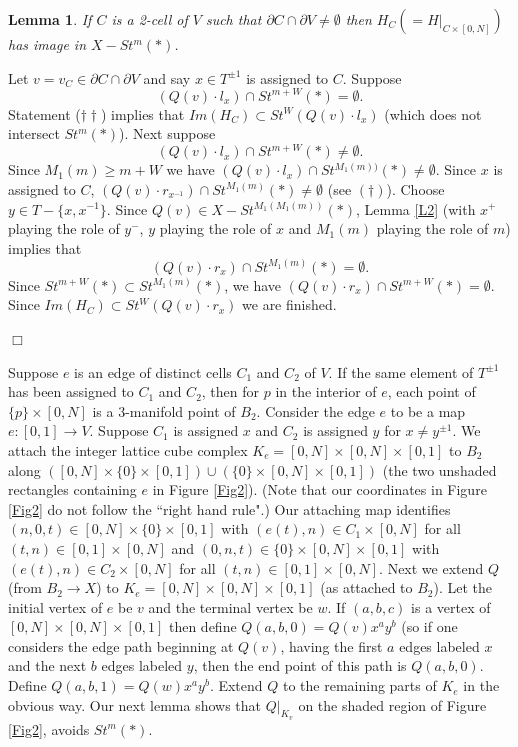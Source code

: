 \documentclass[12pt]{article}
\newtheorem{lemma}[theorem]{Lemma}
\newenvironment{proof}{\addvspace{12pt}\noindent{\bf Proof:}}{
$\Box$\par\addvspace{12pt}}
\numberwithin{equation}{section}
\begin{document}
\begin{lemma}\label{L6}
If $C$ is a 2-cell of $V$ such that  $\partial C\cap \partial V\ne \emptyset$ then $H_C(=H|_{C\times [0,N]})$ has image in $X-St^m(\ast)$. 
\end{lemma}
\begin{proof}
Let $v=v_C\in \partial C\cap \partial V$ and say $x\in T^{\pm1}$ is assigned to $C$.
Suppose 
$$(Q(v)\cdot l_{x})\cap St^{m+W}(\ast)= \emptyset.$$
Statement ($\dagger\dagger$) implies that  $Im(H_C)\subset St^{W}(Q(v)\cdot l_{x})$ (which does not intersect $St^m(\ast)$).
Next suppose 
$$(Q(v)\cdot l_{x})\cap St^{m+W}(\ast)\ne \emptyset .$$ 
Since $M_1(m)\geq m+W$ we have $(Q(v)\cdot l_{x})\cap St^{M_1(m))}(\ast)\ne \emptyset$.
Since $x$ is assigned to $C$, 
 $(Q(v)\cdot r_{x^{-1}})\cap St^{M_1(m)}(\ast)\ne \emptyset$ (see $(\dagger)$). Choose $y\in T-\{x, x^{-1}\}$.
Since $Q(v)\in X-St^{M_1(M_1(m))}(\ast)$, Lemma \ref{L2} (with $x^+$ playing the role of $y^-$, $y$ playing the role of $x$ and $M_1(m)$ playing the role of $m$) implies that 
$$(Q(v)\cdot r_x)\cap St^{M_1(m)}(\ast)=\emptyset.$$ 
Since $St^{m+W}(\ast) \subset St^{M_1(m)}(\ast)$, we have $(Q(v)\cdot r_{x})\cap St^{m+W}(\ast)=\emptyset$. Since $Im(H_C)\subset St^{W}(Q(v)\cdot r_{x})$ we are finished.
\end{proof}

Suppose $e$ is an edge of distinct cells $C_1$ and $C_2$ of $V$. If the same element of $T^{\pm 1}$ has been assigned to $C_1$ and $C_2$, then for $p$ in the interior of $e$, each point of $\{p\}\times [0,N]$ is a 3-manifold point of $B_2$. Consider the edge $e$ to be a map $e:[0,1]\to V$. Suppose $C_1$ is assigned $x$ and $C_2$ is assigned $y$ for $x\ne y^{\pm 1}$. We attach the integer lattice cube complex $K_e= [0,N]\times [0,N]\times [0,1]$ to $B_2$ along $([0,N]\times \{0\}\times [0,1])\cup  (\{0\}\times [0,N]\times [0,1])$ (the two unshaded rectangles containing $e$ in Figure \ref{Fig2}). (Note that our coordinates in Figure \ref{Fig2} do not follow the ``right hand rule".) Our attaching map identifies $(n,0,t)\in [0,N]\times \{0\}\times [0,1]$ with $(e(t),n)\in C_1\times [0,N]$ for all $(t,n)\in [0,1]\times [0,N]$ and $(0,n,t)\in \{0\}\times [0,N]\times [0,1]$ with $(e(t),n)\in C_2\times [0,N]$ for all $(t,n)\in [0,1]\times [0,N]$. 
Next we extend $Q$ (from $B_2\to X$) to $K_e=[0,N]\times[0,N]\times [0,1]$ (as attached to $B_2$). Let the initial vertex of $e$ be $v$ and the terminal vertex be $w$. If $(a,b,c)$ is a vertex of $[0,N]\times[0,N]\times [0,1]$ then define $Q(a,b,0)=Q(v)x^ay^b$ (so if one considers the edge path beginning at $Q(v)$, having the first $a$ edges labeled $x$ and the next $b$ edges labeled $y$, then the end point of this path is $Q(a,b,0)$. Define $Q(a,b,1)=Q(w)x^ay^b$. Extend $Q$ to the remaining parts of  $K_e$ in the obvious way. Our next lemma shows that $Q|_{K_v}$ on the shaded region of Figure \ref{Fig2}, avoids $St^m(\ast)$. 
\end{document}
